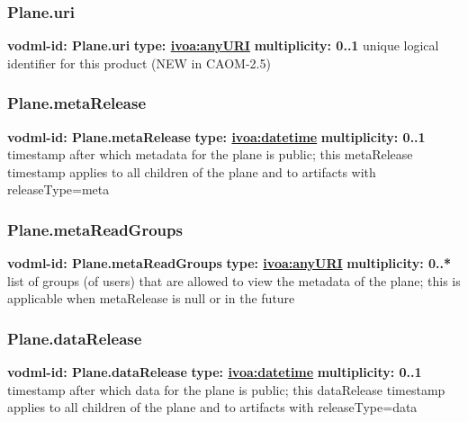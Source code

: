     \subsubsection{Plane.uri}
      \textbf{vodml-id: Plane.uri} \newline
      \textbf{type: \hyperref[sect:ivoa]{ivoa:anyURI}} \newline
      \textbf{multiplicity: 0..1} \newline
      unique logical identifier for this product (NEW in CAOM-2.5)

    \subsubsection{Plane.metaRelease}
      \textbf{vodml-id: Plane.metaRelease} \newline
      \textbf{type: \hyperref[sect:ivoa]{ivoa:datetime}} \newline
      \textbf{multiplicity: 0..1} \newline
      timestamp after which metadata for the plane is public; this metaRelease timestamp applies to all children of the plane and to artifacts with releaseType=meta

    \subsubsection{Plane.metaReadGroups}
      \textbf{vodml-id: Plane.metaReadGroups} \newline
      \textbf{type: \hyperref[sect:ivoa]{ivoa:anyURI}} \newline
      \textbf{multiplicity: 0..*} \newline
      list of groups (of users) that are allowed to view the metadata of the plane; this is applicable when metaRelease is null or in the future

    \subsubsection{Plane.dataRelease}
      \textbf{vodml-id: Plane.dataRelease} \newline
      \textbf{type: \hyperref[sect:ivoa]{ivoa:datetime}} \newline
      \textbf{multiplicity: 0..1} \newline
      timestamp after which data for the plane is public; this dataRelease timestamp applies to all children of the plane and to artifacts with releaseType=data


